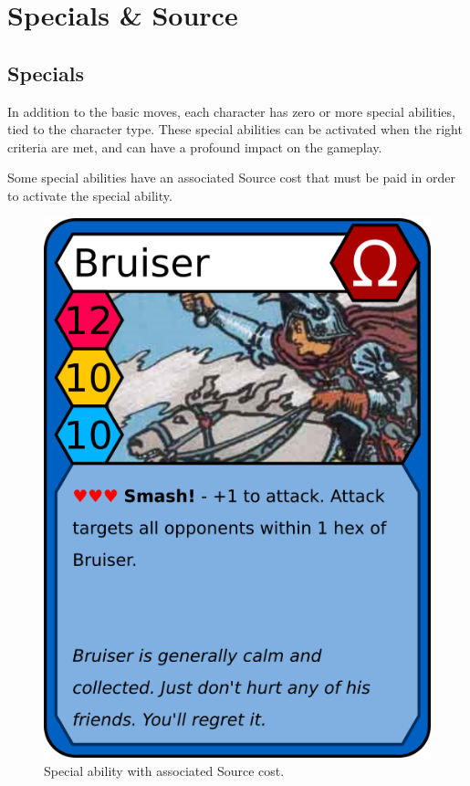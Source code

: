\section{Specials \& Source}\label{energy}
\subsection{Specials}
In addition to the basic moves, each character has zero or more special abilities, tied to the character type.
These special abilities can be activated when the right criteria are met, and can have a profound impact on the gameplay.

Some special abilities have an associated Source cost that must be paid in order to activate the special ability.

\begin{figure}
    \centering
    \includegraphics{graphics/bruiser-red.png}
    \caption{Special ability with associated Source cost.}
    \label{fig:ability-example}
\end{figure}

